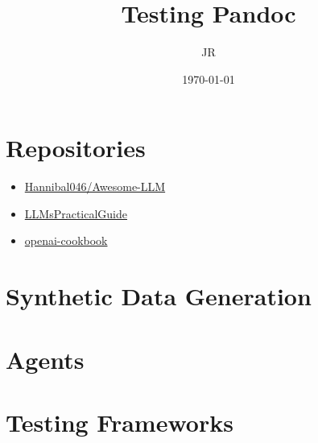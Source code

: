 \documentclass[9pt]{article}
\title{Testing Pandoc}
\author{JR}
\date{\today}
\begin{document}
\maketitle
\tableofcontents
\newpage

\section{Repositories}
\begin{itemize}
  \item \href{https://github.com/Hannibal046/Awesome-LLM}{Hannibal046/Awesome-LLM}
  \item \href{https://github.com/Mooler0410/LLMsPracticalGuide}{LLMsPracticalGuide}
  \item \href{https://github.com/openai/openai-cookbook}{openai-cookbook}
\end{itemize}


\section{Synthetic Data Generation}


\section{Agents}


\section{Testing Frameworks}
\end{document}
